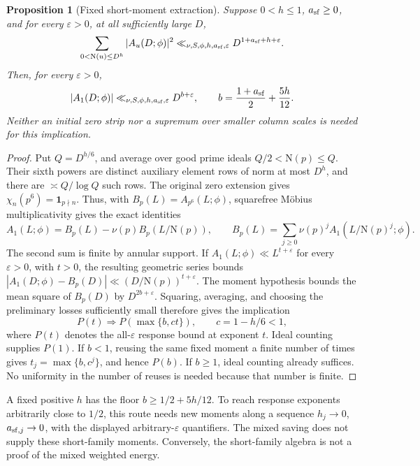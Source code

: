 \documentclass[11pt]{article}
\newtheorem{proposition}[theorem]{Proposition}
\theoremstyle{definition}
\newcommand{\N}{\mathrm N}
\newcommand{\eps}{\varepsilon}
\newcommand{\Id}{\mathbf 1}
\begin{document}
\begin{proposition}[Fixed short-moment extraction]
\label{prop:short-extraction-direct-fragment}
Suppose \(0<h\le1\), \(a_{\rm sf}\ge0\), and for every \(\eps>0\), at all
sufficiently large \(D\),
\begin{equation}
 \sum_{0<\N(u)\le D^h}|A_u(D;\phi)|^2
       \ll_{\nu,S,\phi,h,a_{\rm sf},\eps}D^{1+a_{\rm sf}+h+\eps}.
 \label{eq:short-moment-direct-fragment}
\end{equation}
Then, for every \(\eps>0\),
\begin{equation}
 |A_1(D;\phi)|\ll_{\nu,S,\phi,h,a_{\rm sf},\eps}D^{b+\eps},
 \qquad b=\frac{1+a_{\rm sf}}{2}+\frac{5h}{12}.
 \label{eq:short-floor-direct-fragment}
\end{equation}
Neither an initial zero strip nor a supremum over smaller column scales
is needed for this implication.
\end{proposition}
\begin{proof}
Put \(Q=D^{h/6}\), and average over good prime ideals
\(Q/2<\N(p)\le Q\).  Their sixth powers are distinct auxiliary element rows of
norm at most \(D^h\), and there are \(\asymp Q/\log Q\) such rows.
The original zero extension gives
\(\chi_n(p^6)=\Id_{p\nmid n}\).  Thus, with
\(B_p(L)=A_{p^6}(L;\phi)\), squarefree Möbius multiplicativity gives
the exact identities
\[
 A_1(L;\phi)=B_p(L)-\nu(p)B_p(L/\N(p)),\qquad
 B_p(L)=\sum_{j\ge0}\nu(p)^jA_1(L/\N(p)^j;\phi).
\]
The second sum is finite by annular support.  If
\(A_1(L;\phi)\ll L^{t+\eps}\) for every \(\eps>0\), with \(t>0\),
the resulting geometric series bounds
\(|A_1(D;\phi)-B_p(D)|\ll(D/\N(p))^{t+\eps}\).
The moment hypothesis bounds the mean square of \(B_p(D)\) by
\(D^{2b+\eps}\).  Squaring, averaging, and choosing the preliminary
losses sufficiently small therefore gives the implication
\[
 P(t)\Longrightarrow P(\max\{b,ct\}),\qquad c=1-h/6<1,
\]
where \(P(t)\) denotes the all-\(\eps\) response bound at exponent
\(t\).  Ideal counting supplies \(P(1)\).  If \(b<1\), reusing the
same fixed moment a finite number of times gives
\(t_j=\max\{b,c^j\}\), and hence \(P(b)\).  If \(b\ge1\), ideal
counting already suffices.  No uniformity in the number of reuses is
needed because that number is finite.
\end{proof}

A fixed positive \(h\) has the floor \(b\ge1/2+5h/12\).
To reach response exponents arbitrarily close to \(1/2\), this route
needs new moments along a sequence \(h_j\to0\), \(a_{{\rm sf},j}\to0\), with
the displayed arbitrary-\(\eps\) quantifiers.  The mixed saving does
not supply these short-family moments.  Conversely, the short-family
algebra is not a proof of the mixed weighted energy.
\end{document}
